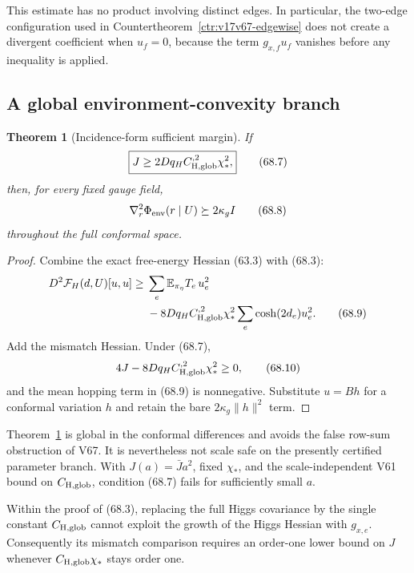 \documentclass[11pt]{article}
\newtheorem{theorem}{Theorem}[section]
\theoremstyle{remark}
\begin{document}
This estimate has no product involving distinct edges.  In particular,
the two-edge configuration used in Countertheorem~\ref{ctr:v17v67-edgewise}
does not create a divergent coefficient when \(u_f=0\), because the
term \(g_{x,f}u_f\) vanishes before any inequality is applied.

\subsection{A global environment-convexity branch}

\begin{theorem}[Incidence-form sufficient margin]
\label{thm:v17v68-margin}
If
\[
\boxed{
 J\geq2Dq_HC_{\rm H,glob}^{,2}\chi_*^2,}         \tag{68.7}
\]
then, for every fixed gauge field,
\[
 \nabla_r^2\Phi_{\rm env}(r\mid U)
 \succeq2\kappa_gI                               \tag{68.8}
\]
throughout the full conformal space.
\end{theorem}

\begin{proof}
Combine the exact free-energy Hessian (63.3) with (68.3):
\[
\begin{aligned}
 D^2\mathcal F_H(d,U)[u,u]
 \geq{}&\sum_e\mathbb E_{\pi_\eta}T_e\,u_e^2\\
 &-8Dq_HC_{\rm H,glob}^{,2}\chi_*^2
   \sum_e\cosh(2d_e)u_e^2.                      \tag{68.9}
\end{aligned}
\]
Add the mismatch Hessian.  Under (68.7),
\[
 4J-8Dq_HC_{\rm H,glob}^{,2}\chi_*^2\geq0,      \tag{68.10}
\]
and the mean hopping term in (68.9) is nonnegative.  Substitute
\(u=Bh\) for a conformal variation \(h\) and retain the bare
\(2\kappa_g\|h\|^2\) term.
\end{proof}

Theorem~\ref{thm:v17v68-margin} is global in the conformal differences
and avoids the false row-sum obstruction of V67.  It is nevertheless
not scale safe on the presently certified parameter branch.  With
\(J(a)=\bar Ja^2\), fixed \(\chi_*\), and the scale-independent V61
bound on \(C_{\rm H,glob}\), condition (68.7) fails for sufficiently
small \(a\).

\begin{countertheorem}
\label{ctr:v17v68-pi}
Within the proof of (68.3), replacing the full Higgs covariance by the
single constant \(C_{\rm H,glob}\) cannot exploit the growth of the
Higgs Hessian with \(g_{x,e}\).  Consequently its mismatch comparison
requires an order-one lower bound on \(J\) whenever
\(C_{\rm H,glob}\chi_*\) stays order one.
\end{countertheorem}
\end{document}
